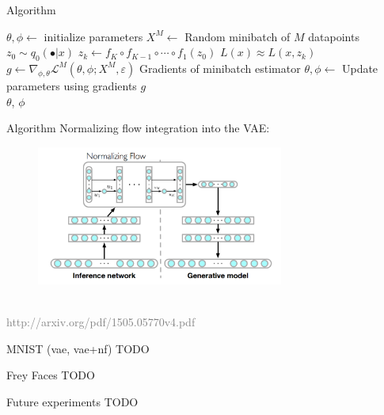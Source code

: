 \documentclass[unicode,11pt]{beamer}
\begin{document}
\begin{frame}[fragile]{Algorithm}
  \begin{algorithmic}
    \State $\theta, \phi \gets$ initialize parameters
    \Repeat
       \State $X^M \gets$ Random minibatch of $M$ datapoints
       \State $z_0 \sim q_0(\bullet|x)$
       \State $z_k \gets f_K \circ f_{K-1} \circ \cdots \circ f_1(z_0)$
       \State $L(x) \approx L(x, z_k)$
       \State $g \gets \nabla_{\phi, \theta} \mathcal{L}^M(\theta, \phi; X^M, \varepsilon) $ Gradients of minibatch estimator
       \State $\theta, \phi \gets$ Update parameters using gradients $g$
    \\
    \Return $\theta$, $\phi$
  \end{algorithmic}

\end{frame}

\begin{frame}[fragile]{Algorithm}
  Normalizing flow integration into the VAE:\\
  \begin{figure}[htbp]
    \includegraphics[height=130pt, keepaspectratio = true]{images/norFlow}
  \end{figure}
  ~\\
  \tiny \textcolor{gray}{http://arxiv.org/pdf/1505.05770v4.pdf}
\end{frame}

\begin{frame}[fragile]{MNIST (vae, vae+nf)}
  TODO
\end{frame}

\begin{frame}[fragile]{Frey Faces}
  TODO
\end{frame}

\begin{frame}[fragile]{Future experiments}
  TODO
\end{frame}
\end{document}
